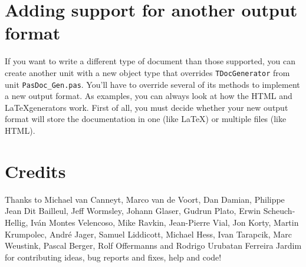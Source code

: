 \documentclass[11pt]{article}
\begin{document}
\section{Adding support for another output format}

If you want to write a different type of document than those supported,
you can create another unit with a new object type that overrides
{\tt TDocGenerator} from unit {\tt PasDoc\_Gen.pas}.
You'll have to override several of its methods to implement a new
output format.
As examples, you can always look at how the HTML and \LaTeX generators
work.
First of all, you must decide whether your new output format will
store the documentation in one (like \LaTeX) or multiple files
(like HTML).


\section{Credits}

Thanks to Michael van Canneyt, Marco van de Voort, Dan Damian, Philippe
Jean Dit Bailleul, Jeff Wormsley, Johann Glaser, Gudrun Plato, Erwin
Scheuch-Hellig, Iv\'{a}n Montes Velencoso, Mike Ravkin, Jean-Pierre Vial,
Jon Korty, Martin Krumpolec, Andr\'{e} Jager, Samuel Liddicott, Michael
Hess, Ivan Tarapcik, Marc Weustink, Pascal Berger, Rolf Offermanns and
Rodrigo Urubatan Ferreira Jardim for contributing ideas, bug reports and
fixes, help and code!
\end{document}

